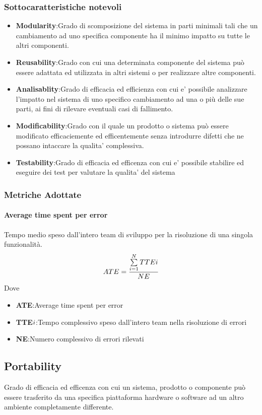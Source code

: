 \subsubsection{Sottocaratteristiche notevoli}
\begin{itemize}
	\item{\textbf{Modularity}}:Grado di scomposizione del sistema in parti minimali tali che un cambiamento ad uno specifica componente ha il minimo impatto su tutte le altri componenti.
	\item{\textbf{Reusability}}:Grado con cui una determinata componente del sistema può essere adattata ed utilizzata in altri sistemi o per realizzare altre componenti.
	\item{\textbf{Analisablity}}:Grado di efficacia ed efficienza con cui e' possibile analizzare l'impatto nel sistema di uno specifico cambiamento ad una o più delle sue parti, ai fini di rilevare eventuali casi di fallimento.
	\item{\textbf{Modificability}}:Grado con il quale un prodotto o sistema può essere modificato efficaciemente ed efficentemente senza introdurre difetti che ne possano intaccare la qualita' complessiva.
	\item{\textbf{Testability}}:Grado di efficacia ed efficenza con cui e' possibile stabilire ed eseguire dei test per valutare la qualita' del sistema
\end{itemize}
\subsubsection{Metriche Adottate}
\paragraph{Average time spent per error}
Tempo medio speso dall'intero team di sviluppo per la risoluzione di una singola funzionalità.
	$$ATE=\frac{\sum\limits_{i=1}^N TTE{\small{i}}}{NE}$$
Dove
\begin{itemize}
	\item{\textbf{ATE}}:Average time spent per error
	\item{\textbf{TTE${\small{i}}$}}:Tempo complessivo speso dall'intero team nella risoluzione di errori
	\item{\textbf{NE}}:Numero complessivo di errori rilevati
\end{itemize}
\subsection{Portability}
Grado di efficacia ed efficenza con cui un sistema, prodotto o componente può essere trasferito da una specifica piattaforma hardware o software ad un altro ambiente completamente differente.
